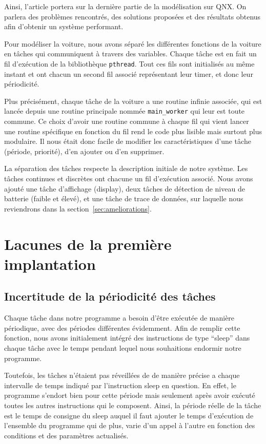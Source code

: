 \documentclass[conference]{IEEEtran}
\begin{document}
Ainsi, l'article portera sur la dernière partie de la modé\-lisation sur QNX. On parlera
des problèmes rencontrés, des solutions proposées et des résultats obtenus afin d'obtenir
un système performant.

Pour modéliser la voiture, nous avons séparé les diffé\-rentes fonctions de la voiture en
tâches qui communiquent à travers des variables. Chaque tâche est en fait un fil
d'exécution de la bibliothèque \texttt{pthread}. Tout ces fils sont initialisés au même
instant et ont chacun un second fil associé représentant leur timer, et donc leur
périodicité.

Plus précisément, chaque tâche de la voiture a une routine infinie associée, qui est
lancée depuis une routine principale nommée \texttt{main\_worker} qui leur est toute
commune. Ce choix d'avoir une routine commune à chaque fil qui vient lancer une routine
spécifique en fonction du fil rend le code plus lisible mais surtout plus modulaire. Il
nous était donc facile de modifier les caractéristiques d'une tâche (période, priorité),
d'en ajouter ou d'en supprimer.

La séparation des tâches respecte la description initiale de notre système. Les tâches
continues et discrètes ont chacune un fil d'exécution associé. Nous avons ajouté une tâche
d'affichage (display), deux tâches de détection de niveau de batterie (faible et élevé),
et une tâche de trace de données, sur laquelle nous reviendrons dans la
section~\ref{sec:ameliorations}.



\section{Lacunes de la première implantation}

\subsection{Incertitude de la périodicité des tâches}

Chaque tâche dans notre programme a besoin d'être exécutée de manière périodique, avec des
périodes différentes évidemment. Afin de remplir cette fonction, nous avons initialement
intégré des instructions de type \enquote{sleep} dans chaque tâche avec le temps pendant
lequel nous souhaitions endormir notre programme.

Toutefois, les tâches n'étaient pas réveillées de de manière précise a chaque intervalle
de temps indiqué par l'instruction sleep en question. En effet, le programme s'endort bien
pour cette période mais seulement après avoir exécuté toutes les autres instructions qui
le composent. Ainsi, la période réelle de la tâche est le temps de consigne du sleep
auquel il faut ajouter le temps d'exécution de l'ensemble du programme qui de plus, varie
d'un appel à l'autre en fonction des conditions et des paramètres actualisés.
\end{document}
